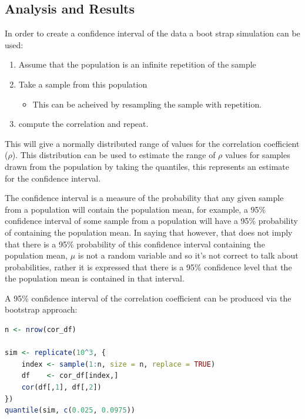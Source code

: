 \documentclass{article}
\providecommand{\tightlist}{%
  \setlength{\itemsep}{0pt}\setlength{\parskip}{0pt}}
\begin{document}
\hypertarget{analysis-and-results-2}{%
\subsection{Analysis and Results}\label{analysis-and-results-2}}

In order to create a confidence interval of the data a boot strap
simulation can be used:

\begin{enumerate}
\def\labelenumi{\arabic{enumi}.}
\tightlist
\item
  Assume that the population is an infinite repetition of the sample
\item
  Take a sample from this population

  \begin{itemize}
  \tightlist
  \item
    This can be acheived by resampling the sample with repetition.
  \end{itemize}
\item
  compute the correlation and repeat.
\end{enumerate}

This will give a normally distributed range of values for the
correlation coefficient (\(\rho\)). This distribution can be used to
estimate the range of \(\rho\) values for samples drawn from the
population by taking the quantiles, this represents an estimate for the
confidence interval.

The confidence interval is a measure of the probability that any given
sample from a population will contain the population mean, for example,
a 95\% confidence interval of some sample from a population will have a
95\% probability of containing the population mean. In saying that
however, that does not imply that there is a 95\% probability of this
confidence interval containing the population mean, \(\mu\) is not a
random variable and so it's not correct to talk about probabilities,
rather it is expressed that there is a 95\% confidence level that the
the population mean is contained in that interval.

A 95\% confidence interval of the correlation coefficient can be
produced via the bootstrap approach:

\begin{lstlisting}[language=R]
n <- nrow(cor_df)

sim <- replicate(10^3, {
    index <- sample(1:n, size = n, replace = TRUE)
    df    <- cor_df[index,]
    cor(df[,1], df[,2])
})
quantile(sim, c(0.025, 0.0975))
\end{lstlisting}
\end{document}
